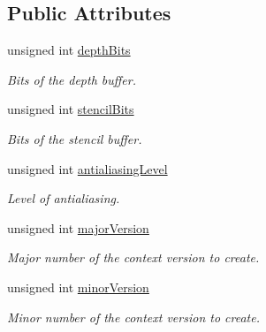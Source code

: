 \subsection*{Public Attributes}
\begin{DoxyCompactItemize}
\item 
\hypertarget{structsf_1_1_context_settings_a4809e22089c2af7276b8809b5aede7bb}{unsigned int \hyperlink{structsf_1_1_context_settings_a4809e22089c2af7276b8809b5aede7bb}{depth\+Bits}}\label{structsf_1_1_context_settings_a4809e22089c2af7276b8809b5aede7bb}

\begin{DoxyCompactList}\small\item\em Bits of the depth buffer. \end{DoxyCompactList}\item 
\hypertarget{structsf_1_1_context_settings_ac2e788c201ca20e84fd38a28071abd29}{unsigned int \hyperlink{structsf_1_1_context_settings_ac2e788c201ca20e84fd38a28071abd29}{stencil\+Bits}}\label{structsf_1_1_context_settings_ac2e788c201ca20e84fd38a28071abd29}

\begin{DoxyCompactList}\small\item\em Bits of the stencil buffer. \end{DoxyCompactList}\item 
\hypertarget{structsf_1_1_context_settings_ac4a097be18994dba38d73f36b0418bdc}{unsigned int \hyperlink{structsf_1_1_context_settings_ac4a097be18994dba38d73f36b0418bdc}{antialiasing\+Level}}\label{structsf_1_1_context_settings_ac4a097be18994dba38d73f36b0418bdc}

\begin{DoxyCompactList}\small\item\em Level of antialiasing. \end{DoxyCompactList}\item 
\hypertarget{structsf_1_1_context_settings_a99a680d5c15a7e34c935654155dd5166}{unsigned int \hyperlink{structsf_1_1_context_settings_a99a680d5c15a7e34c935654155dd5166}{major\+Version}}\label{structsf_1_1_context_settings_a99a680d5c15a7e34c935654155dd5166}

\begin{DoxyCompactList}\small\item\em Major number of the context version to create. \end{DoxyCompactList}\item 
\hypertarget{structsf_1_1_context_settings_aaeb0efe9d2658b840da93b30554b100f}{unsigned int \hyperlink{structsf_1_1_context_settings_aaeb0efe9d2658b840da93b30554b100f}{minor\+Version}}\label{structsf_1_1_context_settings_aaeb0efe9d2658b840da93b30554b100f}

\begin{DoxyCompactList}\small\item\em Minor number of the context version to create. \end{DoxyCompactList}\end{DoxyCompactItemize}


